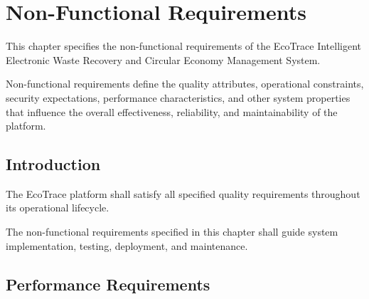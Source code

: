 \chapter{Non-Functional Requirements}
\label{chap:non-functional-requirements}

This chapter specifies the non-functional requirements of the EcoTrace
Intelligent Electronic Waste Recovery and Circular Economy Management
System.

Non-functional requirements define the quality attributes, operational
constraints, security expectations, performance characteristics, and
other system properties that influence the overall effectiveness,
reliability, and maintainability of the platform.


\section{Introduction}
\label{sec:nfr-introduction}

The EcoTrace platform shall satisfy all specified quality requirements
throughout its operational lifecycle.

The non-functional requirements specified in this chapter shall guide
system implementation, testing, deployment, and maintenance.

\section{Performance Requirements}
\label{sec:performance}

